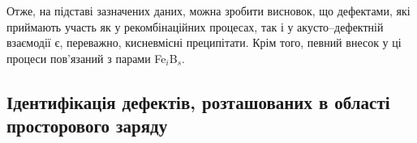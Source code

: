 Отже, на підставі зазначених даних, можна зробити висновок,
що дефектами, які приймають участь як у рекомбінаційних процесах, так і у акусто--дефектній взаємодії є, переважно,
кисневмісні преципітати.
Крім того, певний внесок у ці процеси пов'язаний з парами Fe$_i$B$_s$.


\subsection{Ідентифікація дефектів, розташованих в області просторового \mbox{заряду}}



